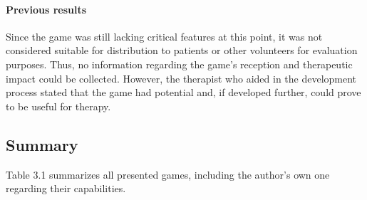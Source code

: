 \documentclass[draft,final]{vutinfth} %
\begin{document}
\paragraph{Previous results}
Since the game was still lacking critical features at this point, it was not considered suitable for distribution to patients or other volunteers for evaluation purposes. Thus, no information regarding the game's reception and therapeutic impact could be collected. However, the therapist who aided in the development process stated that the game had potential and, if developed further, could prove to be useful for therapy.
\subsection{Summary}
Table 3.1 summarizes all presented games, including the author's own one regarding their capabilities.
\end{document}
